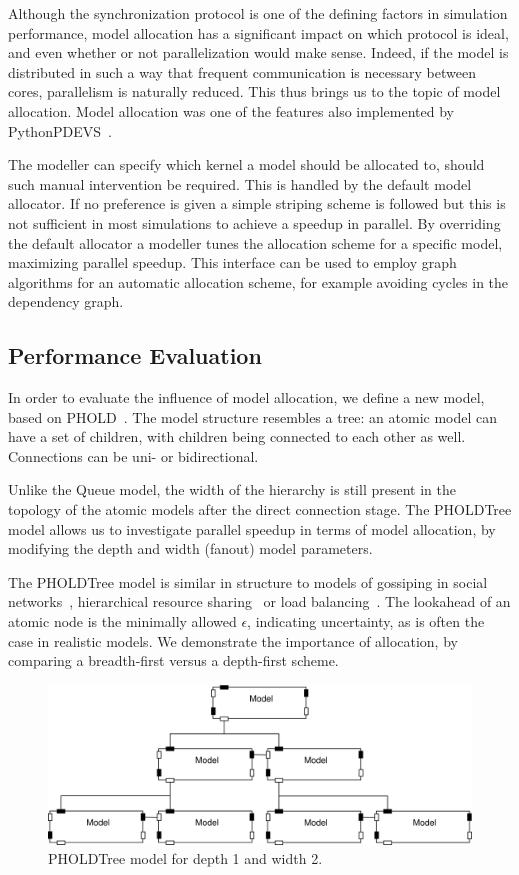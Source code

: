 Although the synchronization protocol is one of the defining factors in simulation performance, model allocation has a significant impact on which protocol is ideal, and even whether or not parallelization would make sense.
Indeed, if the model is distributed in such a way that frequent communication is necessary between cores, parallelism is naturally reduced.
This thus brings us to the topic of model allocation.
Model allocation was one of the features also implemented by PythonPDEVS~\cite{PythonPDEVS2}.

The modeller can specify which kernel a model should be allocated to, should such manual intervention be required.
This is handled by the default model allocator.
If no preference is given a simple striping scheme is followed but this is not sufficient in most simulations to achieve a speedup in parallel.
By overriding the default allocator a modeller tunes the allocation scheme for a specific model, maximizing parallel speedup.
This interface can be used to employ graph algorithms for an automatic allocation scheme, for example avoiding cycles in the dependency graph.

\subsection{Performance Evaluation}
In order to evaluate the influence of model allocation, we define a new model, based on PHOLD~\cite{PHOLD}.
The model structure resembles a tree: an atomic model can have a set of children, with children being connected to each other as well.
Connections can be uni- or bidirectional.

Unlike the Queue model, the width of the hierarchy is still present in the topology of the atomic models after the direct connection stage.
The PHOLDTree model allows us to investigate parallel speedup in terms of model allocation, by modifying the depth and width (fanout) model parameters.

The PHOLDTree model is similar in structure to models of gossiping in social networks~\cite{?}, hierarchical resource sharing~\cite{?} or load balancing~\cite{?}.
The lookahead of an atomic node is the minimally allowed $\epsilon$, indicating uncertainty, as is often the case in realistic models.
We demonstrate the importance of allocation, by comparing a breadth-first versus a depth-first scheme.

\begin{figure}
\includegraphics[width=\modelfraction\columnwidth]{fig/pholdtree.pdf}
\caption{PHOLDTree model for depth 1 and width 2.}
\label{fig:PHOLDTree_model}
\end{figure}

